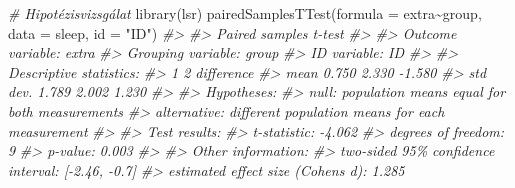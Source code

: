 \documentclass[
]{book}
\newenvironment{Shaded}{\begin{snugshade}}{\end{snugshade}}
\newcommand{\AttributeTok}[1]{\textcolor[rgb]{0.77,0.63,0.00}{#1}}
\newcommand{\CommentTok}[1]{\textcolor[rgb]{0.56,0.35,0.01}{\textit{#1}}}
\newcommand{\FunctionTok}[1]{\textcolor[rgb]{0.00,0.00,0.00}{#1}}
\newcommand{\NormalTok}[1]{#1}
\newcommand{\SpecialCharTok}[1]{\textcolor[rgb]{0.00,0.00,0.00}{#1}}
\newcommand{\StringTok}[1]{\textcolor[rgb]{0.31,0.60,0.02}{#1}}
\begin{document}
\begin{Shaded}
\begin{Highlighting}[]
\CommentTok{\# Hipotézisvizsgálat}
\FunctionTok{library}\NormalTok{(lsr)}
\FunctionTok{pairedSamplesTTest}\NormalTok{(}\AttributeTok{formula =}\NormalTok{ extra}\SpecialCharTok{\textasciitilde{}}\NormalTok{group, }\AttributeTok{data =}\NormalTok{ sleep, }\AttributeTok{id =} \StringTok{"ID"}\NormalTok{)}
\CommentTok{\#\textgreater{} }
\CommentTok{\#\textgreater{}    Paired samples t{-}test }
\CommentTok{\#\textgreater{} }
\CommentTok{\#\textgreater{} Outcome variable:   extra }
\CommentTok{\#\textgreater{} Grouping variable:  group }
\CommentTok{\#\textgreater{} ID variable:        ID }
\CommentTok{\#\textgreater{} }
\CommentTok{\#\textgreater{} Descriptive statistics: }
\CommentTok{\#\textgreater{}                 1     2 difference}
\CommentTok{\#\textgreater{}    mean     0.750 2.330     {-}1.580}
\CommentTok{\#\textgreater{}    std dev. 1.789 2.002      1.230}
\CommentTok{\#\textgreater{} }
\CommentTok{\#\textgreater{} Hypotheses: }
\CommentTok{\#\textgreater{}    null:        population means equal for both measurements}
\CommentTok{\#\textgreater{}    alternative: different population means for each measurement}
\CommentTok{\#\textgreater{} }
\CommentTok{\#\textgreater{} Test results: }
\CommentTok{\#\textgreater{}    t{-}statistic:  {-}4.062 }
\CommentTok{\#\textgreater{}    degrees of freedom:  9 }
\CommentTok{\#\textgreater{}    p{-}value:  0.003 }
\CommentTok{\#\textgreater{} }
\CommentTok{\#\textgreater{} Other information: }
\CommentTok{\#\textgreater{}    two{-}sided 95\% confidence interval:  [{-}2.46, {-}0.7] }
\CommentTok{\#\textgreater{}    estimated effect size (Cohen\textquotesingle{}s d):  1.285}
\end{Highlighting}
\end{Shaded}


  
\end{document}
